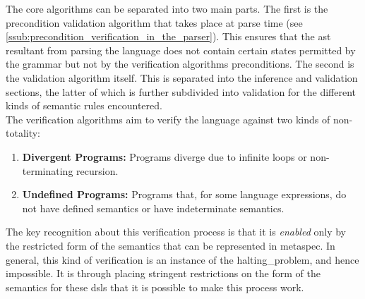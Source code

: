 The core algorithms can be separated into two main parts.
The first is the precondition validation algorithm that takes place at parse time (see \autoref{ssub:precondition_verification_in_the_parser}).
This ensures that the \gls{ast} resultant from parsing the language does not contain certain states permitted by the grammar but not by the verification algorithms preconditions. 
The second is the validation algorithm itself.
This is separated into the inference and validation sections, the latter of which is further subdivided into validation for the different kinds of semantic rules encountered. \\

The verification algorithms aim to verify the language against two kinds of non-totality:
\begin{enumerate}
    \item \textbf{Divergent Programs:} Programs \gls{diverge} due to infinite loops or non-terminating recursion.
    \item \textbf{Undefined Programs:} Programs that, for some language expressions, do not have defined semantics or have indeterminate semantics.
\end{enumerate}

The key recognition about this verification process is that it is \textit{enabled} only by the restricted form of the semantics that can be represented in \gls{metaspec}.
In general, this kind of verification is an instance of the \gls{halting_problem}, and hence impossible.
It is through placing stringent restrictions on the form of the semantics for these \glspl{dsl} that it is possible to make this process work. 

